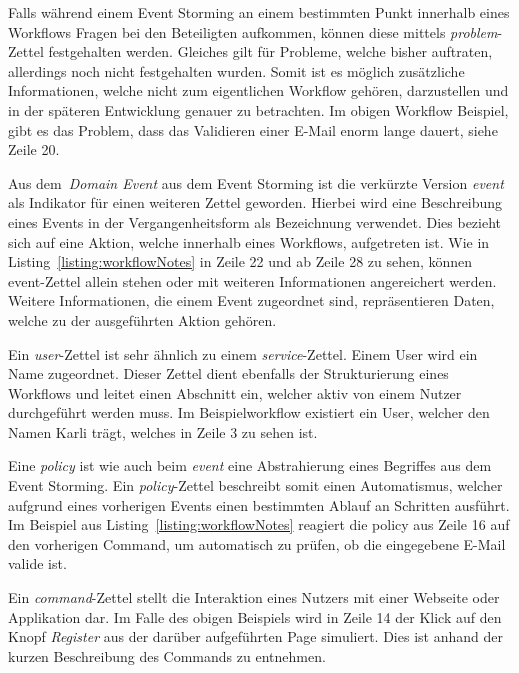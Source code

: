 
Falls während einem Event Storming an einem bestimmten Punkt innerhalb eines Workflows Fragen bei den Beteiligten aufkommen,
können diese mittels \textit{problem}-Zettel festgehalten werden.
Gleiches gilt für Probleme, welche bisher auftraten, allerdings noch nicht festgehalten wurden.
Somit ist es möglich zusätzliche Informationen, welche nicht zum eigentlichen Workflow gehören, darzustellen und in der
späteren Entwicklung genauer zu betrachten.
Im obigen Workflow Beispiel, gibt es das Problem, dass das Validieren einer E-Mail enorm lange dauert, siehe Zeile 20.


Aus dem~\textit{Domain Event} aus dem Event Storming ist die verkürzte Version \textit{event} als Indikator für einen weiteren Zettel geworden.
Hierbei wird eine Beschreibung eines Events in der Vergangenheitsform als Bezeichnung verwendet.
Dies bezieht sich auf eine Aktion, welche innerhalb eines Workflows, aufgetreten ist.
Wie in Listing~\ref{listing:workflowNotes} in Zeile 22 und ab Zeile 28 zu sehen, können event-Zettel allein stehen oder mit weiteren Informationen
angereichert werden.
Weitere Informationen, die einem Event zugeordnet sind, repräsentieren Daten, welche zu der ausgeführten Aktion gehören.


Ein \textit{user}-Zettel ist sehr ähnlich zu einem \textit{service}-Zettel.
Einem User wird ein Name zugeordnet.
Dieser Zettel dient ebenfalls der Strukturierung eines Workflows und leitet einen Abschnitt ein, welcher aktiv von einem
Nutzer durchgeführt werden muss.
Im Beispielworkflow existiert ein User, welcher den Namen Karli trägt, welches in Zeile 3 zu sehen ist.

Eine \textit{policy} ist wie auch beim \textit{event} eine Abstrahierung eines Begriffes aus dem Event Storming.
Ein \textit{policy}-Zettel beschreibt somit einen Automatismus, welcher aufgrund eines vorherigen Events einen bestimmten
Ablauf an Schritten ausführt.
Im Beispiel aus Listing~\ref{listing:workflowNotes} reagiert die policy aus Zeile 16 auf den vorherigen Command, um automatisch zu prüfen,
ob die eingegebene E-Mail valide ist.


Ein \textit{command}-Zettel stellt die Interaktion eines Nutzers mit einer Webseite oder Applikation dar.
Im Falle des obigen Beispiels wird in Zeile 14 der Klick auf den Knopf \textit{Register} aus der darüber aufgeführten Page simuliert.
Dies ist anhand der kurzen Beschreibung des Commands zu entnehmen.

